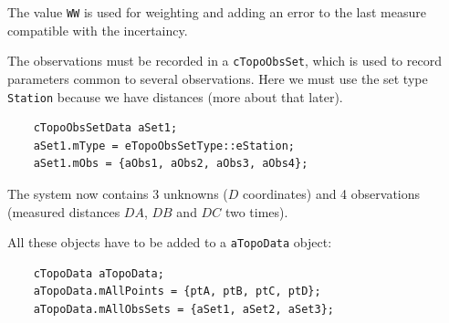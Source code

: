 The value \texttt{WW} is used for weighting and adding an error to the last measure
compatible with the incertaincy.

The observations must be recorded in a \texttt{cTopoObsSet}, which is used to
record parameters common to several observations.
Here we must use the set type \texttt{Station} because we have distances (more about that later).

\begin{lstlisting}
    cTopoObsSetData aSet1;
    aSet1.mType = eTopoObsSetType::eStation;
    aSet1.mObs = {aObs1, aObs2, aObs3, aObs4};
\end{lstlisting}

The system now contains 3 unknowns ($D$ coordinates) and 4 observations
(measured distances $DA$, $DB$ and $DC$ two times).

All these objects have to be added to a \texttt{aTopoData} object:

\begin{lstlisting}
    cTopoData aTopoData;
    aTopoData.mAllPoints = {ptA, ptB, ptC, ptD};
    aTopoData.mAllObsSets = {aSet1, aSet2, aSet3};
\end{lstlisting}

